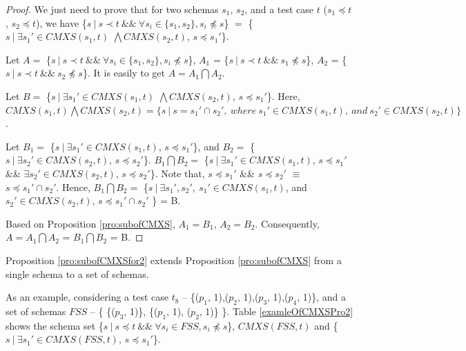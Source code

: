 \begin{proof}

We just need to prove that for two schemas $s_{1}$, $s_{2}$, and a test case $t$ ($s_{1} \preceq t$, $s_{2} \preceq t$), we have \{$s\ |\ s \prec t\ \&\&\ \forall s_{i} \in \{s_{1}, s_{2}\}, s_{i} \npreceq s $\} $=$  \{$ s\ |\ \exists s_{1}' \in CMXS(s_{1}, t)$ $\bigwedge CMXS(s_{2}, t)$, $s \preceq s_{1}'$\}.

Let $A = $ \{$s\ |\ s \prec t\ \&\&\ \forall s_{i} \in \{s_{1}, s_{2}\}, s_{i} \npreceq s $\}, $A_{1}$ = \{$s\ |\ s \prec t\ \&\&\  s_{1} \npreceq s $\}, $A_{2}$ = \{$s\ |\ s \prec t\ \&\&\  s_{2} \npreceq s $\}. It is easily to get $A = A_{1} \bigcap A_{2}$.

Let $B = $ \{$ s\ |\ \exists s_{1}' \in CMXS(s_{1}, t)$ $\bigwedge CMXS(s_{2}, t)$, $s \preceq s_{1}'$\}. Here,  $ CMXS(s_{1}, t) \bigwedge CMXS(s_{2}, t) = \{ s\ |\ s = s_{1}' \cap s_{2}',\ where\ s_{1}' \in CMXS(s_{1}, t),\ and\ s_{2}' \in CMXS(s_{2}, t) \}$.

Let $B_{1} = $ \{$ s\ |\ \exists s_{1}' \in CMXS(s_{1}, t)$, $s \preceq s_{1}'$\}, and $B_{2} = $ \{$ s\ |\ \exists s_{2}' \in CMXS(s_{2}, t)$, $s \preceq s_{2}'$\}. $B_{1} \bigcap B_{2} = $ \{$ s\ |\ \exists s_{1}' \in CMXS(s_{1}, t)$, $s \preceq s_{1}'$ \&\& $\exists s_{2}' \in CMXS(s_{2}, t)$, $s \preceq s_{2}'$\}. Note that, $s \preceq s_{1}'$ \&\& $s \preceq s_{2}'$ $\equiv$ $s \preceq s_{1}' \cap s_{2}'$. Hence, $B_{1} \bigcap B_{2} = $ \{$ s\ |\ \exists s_{1}', s_{2}',\  s_{1}' \in CMXS(s_{1}, t)$, and $s_{2}' \in CMXS(s_{2}, t)$, $s \preceq s_{1}' \cap s_{2}'$ \} = B.

Based on Proposition \ref{pro:subofCMXS}, $A_{1} = B_{1}$, $A_{2} = B_{2}$. Consequently,
$A = A_{1} \bigcap A_{2}$ = $B_{1} \bigcap B_{2}$  = B.

\end{proof}

Proposition \ref{pro:subofCMXSfor2} extends Proposition \ref{pro:subofCMXS} from a single schema to a set of schemas.


As an example, considering a test case $t_{8}$ -- \{($p_{1}$, 1),($p_{2}$, 1),($p_{3}$, 1),($p_{4}$, 1)\}, and a set of schemas  $FSS$ -- \{ \{($p_{3}$, 1)\},  \{($p_{1}$, 1), ($p_{2}$, 1)\} \}. Table \ref{examleOfCMXSPro2} shows the schema set \{$s\ |\ s \preceq t\ \&\&\ \forall s_{i} \in FSS, s_{i} \npreceq s $\}, $CMXS(FSS, t)$ and \{$ s\ |\ \exists s_{1}' \in CMXS(FSS, t)$, $s \preceq s_{1}'$\}.


